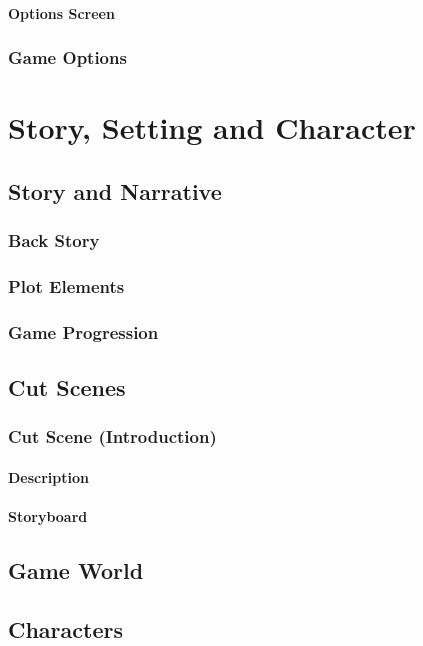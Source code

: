 \documentclass[14pt]{report}
\begin{document}
\subsubsection{Options Screen}
\subsection{Game Options}

\chapter{Story, Setting and Character}
\section{Story and Narrative}
\subsection{Back Story}
\subsection{Plot Elements}
\subsection{Game Progression}

\section{Cut Scenes}
\subsection{Cut Scene (Introduction)}
\subsubsection{Description}
\subsubsection{Storyboard}

\section{Game World}

\section{Characters}
\end{document}
